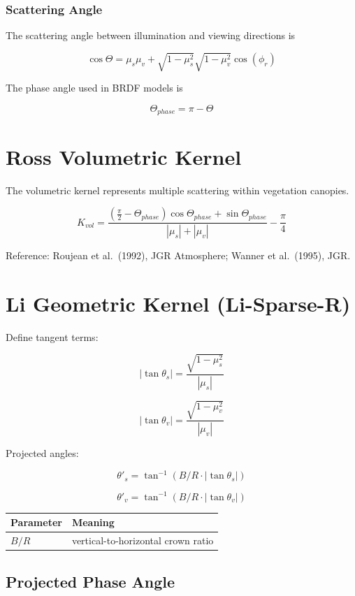 \documentclass[
  letterpaper,
  open=any]{scrbook}
\begin{document}
\subsubsection{Scattering Angle}\label{scattering-angle}

The scattering angle between illumination and viewing directions is

\[
\cos\Theta =
\mu_s\mu_v +
\sqrt{1-\mu_s^2}\sqrt{1-\mu_v^2}\cos(\phi_r)
\]

The phase angle used in BRDF models is

\[
\Theta_{phase} = \pi - \Theta
\]

\section{Ross Volumetric Kernel}\label{ross-volumetric-kernel}

The volumetric kernel represents multiple scattering within vegetation
canopies.

\[
K_{vol} =
\frac{\left(\frac{\pi}{2}-\Theta_{phase}\right)\cos\Theta_{phase} + \sin\Theta_{phase}}
{|\mu_s| + |\mu_v|}-\frac{\pi}{4}
\]

Reference: Roujean et al.~(1992), JGR Atmosphere; Wanner et al.~(1995),
JGR.

\section{Li Geometric Kernel
(Li-Sparse-R)}\label{li-geometric-kernel-li-sparse-r}

Define tangent terms:

\[
|\tan\theta_s| = \frac{\sqrt{1-\mu_s^2}}{|\mu_s|}
\]

\[
|\tan\theta_v| = \frac{\sqrt{1-\mu_v^2}}{|\mu_v|}
\]

Projected angles:

\[
\theta'_s = \tan^{-1}(B/R \cdot |\tan\theta_s|)
\]

\[
\theta'_v = \tan^{-1}(B/R \cdot |\tan\theta_v|)
\]

\begin{longtable}[]{@{}ll@{}}
\toprule\noalign{}
Parameter & Meaning \\
\midrule\noalign{}
\endhead
\bottomrule\noalign{}
\endlastfoot
\(B/R\) & vertical-to-horizontal crown ratio \\
\end{longtable}

\subsection{Projected Phase Angle}\label{projected-phase-angle}
\end{document}
